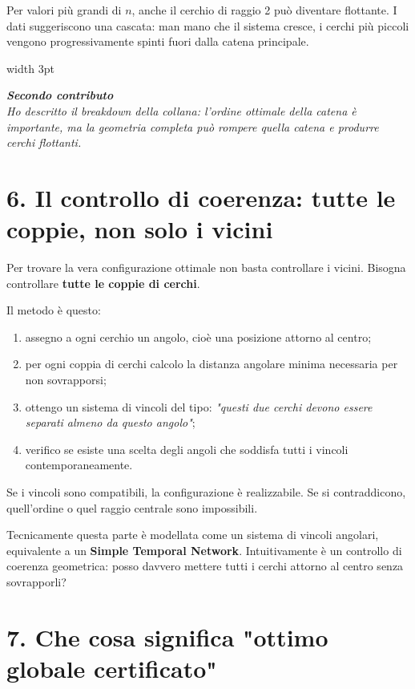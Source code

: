 \documentclass[11pt,a4paper]{article}
\newcommand{\customquote}[1]{
  \par\smallskip\noindent
  \colorbox{softgray}{
    \begin{minipage}{\dimexpr\textwidth-2\fboxsep\relax}
      \vspace{0.4em}
      \hspace{0.8em}%
      {\color{slate}\vrule width 3pt}%
      \hspace{0.8em}%
      \begin{minipage}{\dimexpr\textwidth-2\fboxsep-3pt-1.6em\relax}
        \color{charcoal}\itshape\small #1
      \end{minipage}%
      \vspace{0.4em}
    \end{minipage}
  }\par\smallskip
}
\begin{document}
Per valori più grandi di $n$, anche il cerchio di raggio 2 può diventare flottante. I dati suggeriscono una cascata: man mano che il sistema cresce, i cerchi più piccoli vengono progressivamente spinti fuori dalla catena principale.

\customquote{
    \textbf{Secondo contributo} \\
    Ho descritto il breakdown della collana: l'ordine ottimale della catena è importante, ma la geometria completa può rompere quella catena e produrre cerchi flottanti.
}

{\color{navy}\section*{6. Il controllo di coerenza: tutte le coppie, non solo i vicini}}

Per trovare la vera configurazione ottimale non basta controllare i vicini. Bisogna controllare \textbf{tutte le coppie di cerchi}.

Il metodo è questo:
\begin{enumerate}
    \setlength{\itemsep}{0pt}
    \setlength{\parskip}{0pt}
    \item assegno a ogni cerchio un angolo, cioè una posizione attorno al centro;
    \item per ogni coppia di cerchi calcolo la distanza angolare minima necessaria per non sovrapporsi;
    \item ottengo un sistema di vincoli del tipo: \textit{"questi due cerchi devono essere separati almeno da questo angolo"};
    \item verifico se esiste una scelta degli angoli che soddisfa tutti i vincoli contemporaneamente.
\end{enumerate}

Se i vincoli sono compatibili, la configurazione è realizzabile. Se si contraddicono, quell'ordine o quel raggio centrale sono impossibili.

Tecnicamente questa parte è modellata come un sistema di vincoli angolari, equivalente a un \textbf{Simple Temporal Network}. Intuitivamente è un controllo di coerenza geometrica: posso davvero mettere tutti i cerchi attorno al centro senza sovrapporli?

{\color{navy}\section*{7. Che cosa significa "ottimo globale certificato"}}
\end{document}
